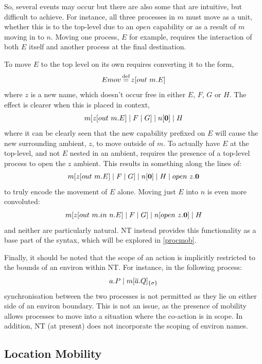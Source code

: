 So, several events may occur but there are also some that are intuitive,
but difficult to achieve.  For instance, all three processes in $m$ must
move as a unit, whether this is to the top-level due to an $open$
capability or as a result of $m$ moving in to $n$.  Moving one process,
$E$ for example, requires the interaction of both $E$ itself and another
process at the final destination.

To move $E$ to the top level on its own requires converting it to the
form,
\begin{equation}
Emov \operatorname{\stackrel{\textrm{def}}{=}} z[out\ m.E]
\end{equation}
where $z$ is a new name, which doesn't occur free in either
$E$, $F$, $G$ or $H$.  The effect is clearer when this is placed in
context,
\begin{equation}
m[z[out\ m.E]\;|\;F\;|\;G]\;|\;n[\textbf{0}]\;|\;H
\end{equation}
where it can be clearly seen that the new capability prefixed
on $E$ will cause the new surrounding ambient, $z$, to move outside of
$m$.  To actually have $E$ at the top-level, and not $E$ nested in an
ambient, requires the presence of a top-level process to open the $z$
ambient.  This results in something along the lines of:
\begin{equation}
m[z[out\ m.E]\;|\;F\;|\;G]\;|\;n[\textbf{0}]\;|\;H\;|\;open\ z.\textbf{0}
\end{equation}
to truly encode the movement of $E$ alone.  Moving just $E$
into $n$ is even more convoluted:
\begin{equation}
m[z[out\ m.in\ n.E]\;|\;F\;|\;G]\;|\;n[open\ z.\textbf{0}]\;|\;H
\end{equation}
and neither are particularly natural.  NT instead provides
this functionality as a base part of the syntax, which will be explored
in \ref{procmob}.  

Finally, it should be noted that the scope of an action is implicitly
restricted to the bounds of an environ within NT.  For instance, in the
following process:
\begin{equation}
a.P \;|\; {m}[ \overline{a}.Q ]_{\{\sigma\}}
\end{equation}
synchronisation between the two processes is not permitted as
they lie on either side of an environ boundary.  This is not an issue,
as the presence of mobility allows processes to move into a situation
where the co-action is in scope.  In addition, NT (at present) does not
incorporate the scoping of environ names.

\subsection{Location Mobility}
\label{locmob}

